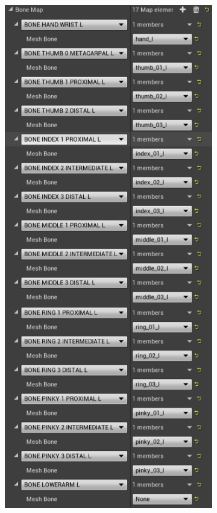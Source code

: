 \begin{figure}[!htb]
    \begin{minipage}{\linewidth}
        \centering
        \begin{subfigure}{0.49\textwidth}
            \centering
            \includegraphics[width=\textwidth]{figures/mappedBones.png}

\end{subfigure}
\end{minipage}
\end{figure}
